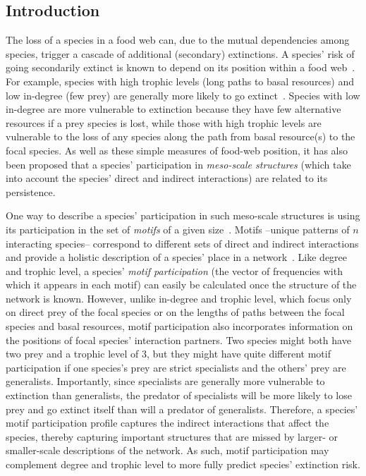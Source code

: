 \documentclass[12pt]{article}
\begin{document}
\clearpage
\begin{spacing}{2.0}
\linenumbers

\section*{Introduction} %

    The loss of a species in a food web can, due to the mutual dependencies among species,  trigger a cascade of additional (secondary) extinctions. 
    A species' risk of going secondarily extinct is known to depend on its position within a food web~\citep{Santos2021,curtsdotter2011robustness, dunne2009cascading, Eklof2006}.
    For example, species with high trophic levels (long paths to basal resources) and low in-degree (few prey) are generally more likely to go extinct~\citep{binzer2011susceptibility, Eklof2006}.
    Species with low in-degree are more vulnerable to extinction because they have few alternative resources if a prey species is lost, while those with high trophic levels are vulnerable to the loss of any species along the path from basal resource(s) to the focal species.
    As well as these simple measures of food-web position, it has also been proposed that a species' participation in \emph{meso-scale structures} (which take into account the species' direct and indirect interactions) are related to its persistence.
    
    
    One way to describe a species' participation in such meso-scale structures is using its participation in the set of \emph{motifs} of a given size~\citep{Cirtwill2015a,Cirtwill2018FoodWebs}.
    Motifs --unique patterns of $n$ interacting species-- correspond to different sets of direct and indirect interactions and provide a holistic description of a species' place in a network~\citep{Stouffer2007,Stouffer2012}.
    Like degree and trophic level, a species' \emph{motif participation} (the vector of frequencies with which it appears in each motif) can easily be calculated once the structure of the network is known.
    However, unlike in-degree and trophic level, which focus only on direct prey of the focal species or on the lengths of paths between the focal species and basal resources, motif participation also incorporates information on the positions of focal species' interaction partners.
    Two species might both have two prey and a trophic level of 3, but they might have quite different motif participation if one species's prey are strict specialists and the others' prey are generalists.
    Importantly, since specialists are generally more vulnerable to extinction than generalists, the predator of specialists will be more likely to lose prey and go extinct itself than will a predator of generalists.
    Therefore, a species' motif participation profile captures the indirect interactions that affect the species, thereby capturing important structures that are missed by larger- or smaller-scale descriptions of the network.
    As such, motif participation may complement degree and trophic level to more fully predict species' extinction risk.
    

\end{spacing}
\end{document}
